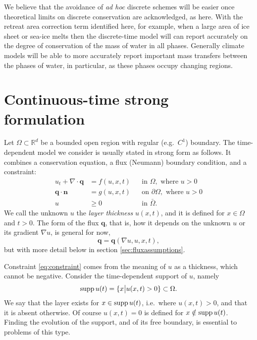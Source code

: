 \documentclass[final,leqno,onefignum,onetabnum]{siamltex1213bueler}
\newcommand\bn{\mathbf{n}}
\newcommand\bq{\mathbf{q}}
\newcommand{\Div}{\nabla\cdot}
\renewcommand{\grad}{\nabla}
\newcommand\RR{\mathbb{R}}
\begin{document}
We believe that the avoidance of \emph{ad hoc} discrete schemes will be easier once theoretical limits on discrete conservation are acknowledged, as here.  With the retreat area correction term identified here, for example, when a large area of ice sheet or sea-ice melts then the discrete-time model will can report accurately on the degree of conservation of the mass of water in all phases.  Generally climate models will be able to more accurately report important mass transfers between the phases of water, in particular, as these phases occupy changing regions.


\section{Continuous-time strong formulation}  \label{sec:strongform}

Let $\Omega \subset \RR^d$ be a bounded open region with regular (e.g.~$C^1$) boundary.  The time-dependent model we consider is usually stated in strong form as follows.  It combines a conservation equation, a flux (Neumann) boundary condition, and a constraint:
\begin{align}
u_t + \Div \bq &= f(u,x,t) &&\text{in } \Omega, \text{ where } u > 0 \label{eq:massconserve} \\
\bq \cdot \bn &= g(u,x,t) &&\text{on } \partial\Omega, \text{ where } u > 0 \label{eq:fixedneumann} \\
u &\ge 0 &&\text{in } \bar\Omega. \label{eq:constraint}
\end{align}
We call the unknown $u$ the \emph{layer thickness} $u(x,t)$, and it is defined for $x\in \Omega$ and $t>0$.  The form of the flux $\bq$, that is, how it depends on the unknown $u$ or its gradient $\grad u$, is general for now,
\begin{equation}
\bq = \bq(\grad u,u,x,t), \label{eq:fluxdepends}
\end{equation}
but with more detail below in section \ref{sec:fluxassumptions}.

Constraint \eqref{eq:constraint} comes from the meaning of $u$ as a thickness, which cannot be negative.  Consider the time-dependent support of $u$, namely
   $$\supp u(t) = \{x \big| u(x,t) > 0\} \subset \Omega.$$
We say that the layer exists for $x \in \supp u(t)$, i.e.~where $u(x,t)>0$, and that it is absent otherwise.  Of course $u(x,t)=0$ is defined for $x \notin \supp u (t)$.  Finding the evolution of the support, and of its free boundary, is essential to problems of this type.
\end{document}
